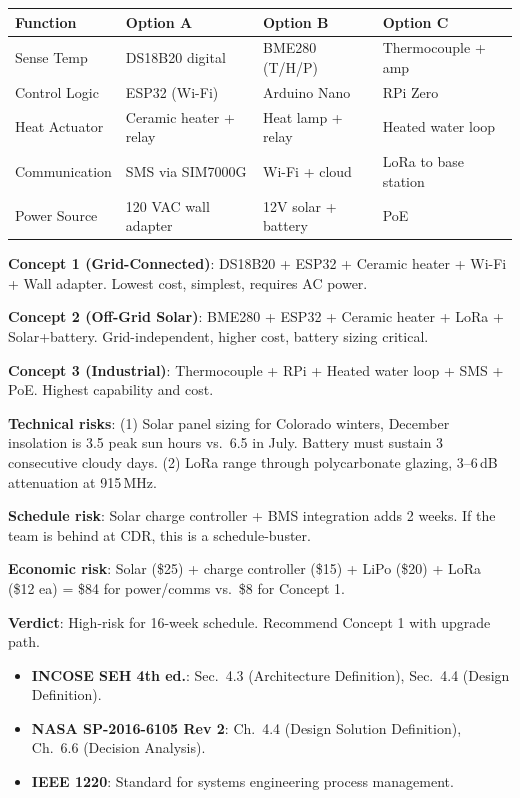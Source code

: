\begin{greenshieldbox}
\small
\begin{tabularx}{\linewidth}{l X X X}
\toprule
\textbf{Function} & \textbf{Option A} & \textbf{Option B} & \textbf{Option C} \\
\midrule
Sense Temp & DS18B20 digital & BME280 (T/H/P) & Thermocouple + amp \\
Control Logic & ESP32 (Wi-Fi) & Arduino Nano & RPi Zero \\
Heat Actuator & Ceramic heater + relay & Heat lamp + relay & Heated water loop \\
Communication & SMS via SIM7000G & Wi-Fi + cloud & LoRa to base station \\
Power Source & 120 VAC wall adapter & 12V solar + battery & PoE \\
\bottomrule
\end{tabularx}

\textbf{Concept 1 (Grid-Connected)}: DS18B20 + ESP32 + Ceramic heater + Wi-Fi + Wall adapter. Lowest cost, simplest, requires AC power.

\textbf{Concept 2 (Off-Grid Solar)}: BME280 + ESP32 + Ceramic heater + LoRa + Solar+battery. Grid-independent, higher cost, battery sizing critical.

\textbf{Concept 3 (Industrial)}: Thermocouple + RPi + Heated water loop + SMS + PoE. Highest capability and cost.
\end{greenshieldbox}

\begin{greenshieldbox}
\textbf{Technical risks}: (1) Solar panel sizing for Colorado winters, December insolation is 3.5 peak sun hours vs.\ 6.5 in July. Battery must sustain 3 consecutive cloudy days. (2) LoRa range through polycarbonate glazing, 3--6\,dB attenuation at 915\,MHz.

\textbf{Schedule risk}: Solar charge controller + BMS integration adds 2 weeks. If the team is behind at CDR, this is a schedule-buster.

\textbf{Economic risk}: Solar (\$25) + charge controller (\$15) + LiPo (\$20) + LoRa (\$12 ea) = \$84 for power/comms vs.\ \$8 for Concept 1.

\textbf{Verdict}: High-risk for 16-week schedule. Recommend Concept 1 with upgrade path.
\end{greenshieldbox}

\begin{keyconceptbox}
\begin{itemize}[nosep,leftmargin=1.5em]
\item \textbf{INCOSE SEH 4th ed.}: Sec.\ 4.3 (Architecture Definition), Sec.\ 4.4 (Design Definition).
\item \textbf{NASA SP-2016-6105 Rev 2}: Ch.\ 4.4 (Design Solution Definition), Ch.\ 6.6 (Decision Analysis).
\item \textbf{IEEE 1220}: Standard for systems engineering process management.
\end{itemize}
\end{keyconceptbox}

